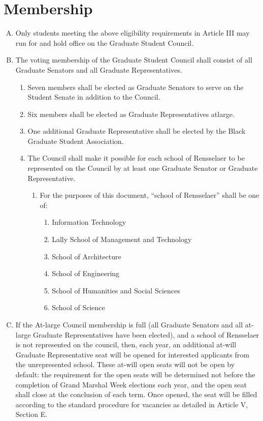 \documentclass[letterpaper,12pt]{article}
\begin{document}
\section{Membership}
\begin{enumerate}[A.]
	\item Only students meeting the above eligibility requirements in Article III may run for and hold office on the Graduate Student Council.
	\item  The voting membership of the Graduate Student Council shall consist of all Graduate Senators and all Graduate Representatives.
	\begin{enumerate}[1.]
		\item Seven members shall be elected as Graduate Senators to serve on the Student Senate in addition to the Council.
		\item Six members shall be elected as Graduate Representatives at­large.
		\item One additional Graduate Representative shall be elected by the Black Graduate Student Association.
		\item The Council shall make it possible for each school of Rensselaer to be represented on the Council by at least one Graduate Senator or Graduate Representative.
		\begin{enumerate}[1.]
			\item For the purposes of this document, “school of Rensselaer” shall be one of:
			\begin{enumerate}[1.]
				\item Information Technology
				\item Lally School of Management and Technology
				\item School of Architecture
				\item School of Engineering
				\item School of Humanities and Social Sciences
				\item School of Science
			\end{enumerate}
		\end{enumerate}
	\end{enumerate}
	\item If the At­-large Council membership is full (all Graduate Senators and all at­-large Graduate Representatives have been elected), and a school of Rensselaer is not represented on the council, then, each year, an additional at­-will Graduate Representative seat will be opened for interested applicants from the unrepresented school. These at­-will open seats will not be open by default: the requirement for the open seats will be determined not before the completion of Grand Marshal Week elections each year, and the open seat shall close at the conclusion of each term. Once opened, the seat will be filled according to the standard procedure for vacancies as detailed in Article V, Section E.

\end{enumerate}
\end{document}
